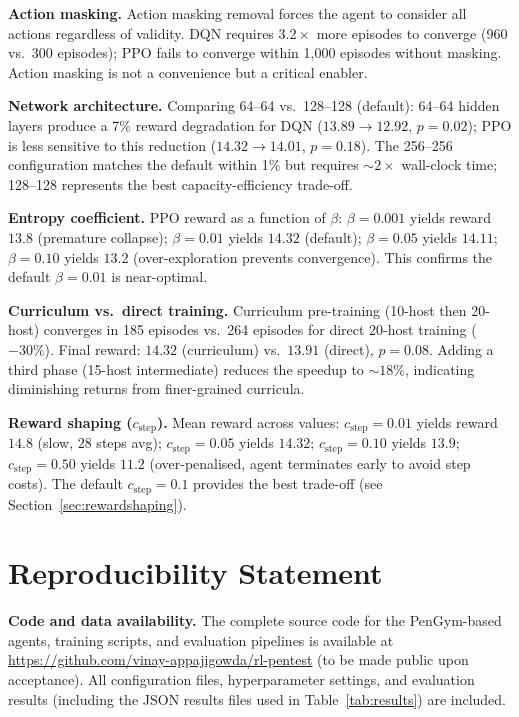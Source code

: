 \documentclass[conference]{IEEEtran}
\begin{document}
\textbf{Action masking.}  Action masking removal forces the agent to
consider all actions regardless of validity.  DQN requires $3.2\times$
more episodes to converge (960 vs.\ 300 episodes); PPO fails to converge
within 1{,}000 episodes without masking.  Action masking is not a
convenience but a critical enabler.

\textbf{Network architecture.}  Comparing 64--64 vs.\ 128--128
(default): 64--64 hidden layers produce a 7\% reward degradation for DQN
($13.89 \to 12.92$, $p=0.02$); PPO is less sensitive to this reduction
($14.32 \to 14.01$, $p=0.18$).  The 256--256 configuration matches the
default within 1\% but requires ${\sim}2\times$ wall-clock time; 128--128
represents the best capacity-efficiency trade-off.

\textbf{Entropy coefficient.}  PPO reward as a function of $\beta$:
$\beta=0.001$ yields reward $13.8$ (premature collapse); $\beta=0.01$
yields $14.32$ (default); $\beta=0.05$ yields $14.11$; $\beta=0.10$
yields $13.2$ (over-exploration prevents convergence).  This confirms
the default $\beta=0.01$ is near-optimal.

\textbf{Curriculum vs.\ direct training.}  Curriculum pre-training
(10-host then 20-host) converges in 185 episodes vs.\ 264 episodes for
direct 20-host training ($-30\%$).  Final reward: $14.32$ (curriculum)
vs.\ $13.91$ (direct), $p=0.08$.  Adding a third phase (15-host
intermediate) reduces the speedup to ${\sim}18\%$, indicating diminishing
returns from finer-grained curricula.

\textbf{Reward shaping ($c_{\text{step}}$).}  Mean reward across values:
$c_{\text{step}}=0.01$ yields reward $14.8$ (slow, $28$ steps avg);
$c_{\text{step}}=0.05$ yields $14.32$; $c_{\text{step}}=0.10$ yields
$13.9$; $c_{\text{step}}=0.50$ yields $11.2$ (over-penalised, agent
terminates early to avoid step costs).  The default $c_{\text{step}}=0.1$
provides the best trade-off (see Section~\ref{sec:rewardshaping}).

\section{Reproducibility Statement}
\label{sec:reproducibility}

\textbf{Code and data availability.}  The complete source code for the
PenGym-based agents, training scripts, and evaluation pipelines is
available at \url{https://github.com/vinay-appajigowda/rl-pentest}
(to be made public upon acceptance).  All configuration files,
hyperparameter settings, and evaluation results (including the JSON
results files used in Table~\ref{tab:results}) are included.
\end{document}
